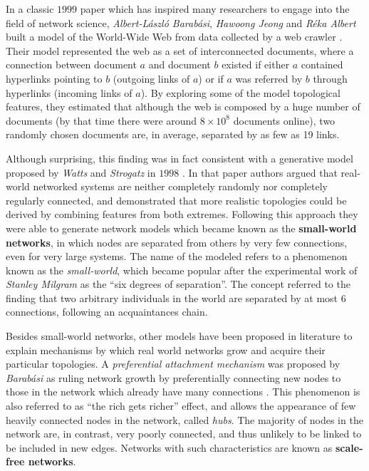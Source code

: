 In a classic $1999$ paper which has inspired many researchers to engage into the field of network science, \textit{Albert-László Barabási}, \textit{Hawoong Jeong} and \textit{Réka Albert} built a model of the World-Wide Web from data collected by a web crawler \cite{Albert1999}. 
Their model represented the web as a set of interconnected documents, where a connection between document $a$ and document $b$ existed if either $a$ contained hyperlinks pointing to $b$ (outgoing links of $a$) or if $a$ was referred by $b$ through hyperlinks (incoming links of $a$).
By exploring some of the model topological features, they estimated that although the web is composed by a huge number of documents (by that time there were around $8 \times 10^8$ documents online), two randomly chosen documents are, in average, separated by as few as 19 links. 

Although surprising, this finding was in fact consistent with a generative model proposed by \textit{Watts} and \textit{Strogatz} in $1998$ \cite{Watts1998}.
In that paper authors argued that real-world networked systems are neither completely randomly nor completely regularly connected, and demonstrated that more realistic topologies could be derived by combining features from both extremes.
Following this approach they were able to generate network models which became known as the \textbf{small-world networks}, in which nodes are separated from others by very few connections, even for very large systems.
The name of the modeled refers to a phenomenon known as the \textit{small-world}, which became popular after the experimental work of \textit{Stanley Milgram} \cite{Milgram1969} as the ``six degrees of separation''.
The concept referred to the finding that two arbitrary individuals in the world are separated by at most 6 connections, following an acquaintances chain.
 
Besides small-world networks, other models have been proposed in literature to explain mechanisms by which real world networks grow and acquire their particular topologies.
A \textit{preferential attachment mechanism} was proposed by \textit{Barabási} as ruling network growth by preferentially connecting new nodes to those in the network which already have many connections \cite{Albert2002}. 
This phenomenon is also referred to as ``the rich gets richer'' effect, and allows the appearance of few heavily connected nodes in the network, called \textit{hubs}. 
The majority of nodes in the network are, in contrast, very poorly connected, and thus unlikely to be linked to be included in new edges.
Networks with such characteristics are known as \textbf{scale-free networks}.

